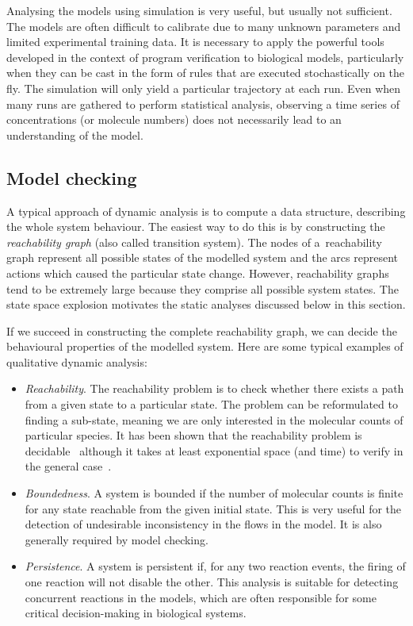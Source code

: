 \documentclass[11pt,a4paper]{report}
\begin{document}
Analysing the models using simulation is very useful, but usually not sufficient. The models are often difficult to calibrate due to many unknown parameters and limited experimental training data. It is necessary to apply the powerful tools developed in the context of program verification to biological models, particularly when
they can be cast in the form of rules that are executed stochastically on the fly. The simulation will only yield a particular trajectory at each run. Even when many runs are gathered to perform statistical analysis, observing a time series of concentrations (or molecule numbers) does not necessarily lead to an understanding of the model.

\subsection{Model checking}

A typical approach of dynamic analysis is to compute a data structure, describing the whole system behaviour. The easiest way to do this is by constructing the \emph{reachability graph} (also called transition system). The nodes of a~reachability graph represent all possible states of the modelled system and the arcs represent actions which caused the particular state change. However, reachability graphs tend to be extremely large because they comprise all possible system states. The state space explosion motivates the static analyses discussed below in this section. 

If we succeed in constructing the complete reachability graph, we can decide the behavioural properties of the modelled system. Here are some typical examples of qualitative dynamic analysis:

\begin{itemize}
	\item \emph{Reachability}. The reachability problem is to check whether there exists a path from a given state to a particular state. The problem can be reformulated to finding a sub-state, meaning we are only interested in the molecular counts of particular species. It has been shown that the reachability problem is decidable~\cite{kosaraju1982decidability} although it takes at least exponential space (and time) to verify in the general case~\cite{lipton1976reachability}.
	\item \emph{Boundedness}. A system is bounded if the number of molecular counts is finite for any state reachable from the given initial state. This is very useful for the detection of undesirable inconsistency in the flows in the model. It is also generally required by model checking.
	\item \emph{Persistence}. A system is persistent if, for any two reaction events, the firing of one reaction will not disable the other. This analysis is suitable for detecting concurrent reactions in the models, which are often responsible for some critical decision-making in biological systems.
\end{itemize}
\end{document}
